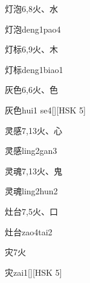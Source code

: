\begin{entry}{灯泡}{6,8}{⽕、⽔}
  \begin{phonetics}{灯泡}{deng1pao4}
  \end{phonetics}
\end{entry}

\begin{entry}{灯标}{6,9}{⽕、⽊}
  \begin{phonetics}{灯标}{deng1biao1}
  \end{phonetics}
\end{entry}

\begin{entry}{灰色}{6,6}{⽕、⾊}
  \begin{phonetics}{灰色}{hui1 se4}[][HSK 5]
  \end{phonetics}
\end{entry}

\begin{entry}{灵感}{7,13}{⽕、⼼}
  \begin{phonetics}{灵感}{ling2gan3}
  \end{phonetics}
\end{entry}

\begin{entry}{灵魂}{7,13}{⽕、⿁}
  \begin{phonetics}{灵魂}{ling2hun2}
  \end{phonetics}
\end{entry}

\begin{entry}{灶台}{7,5}{⽕、⼝}
  \begin{phonetics}{灶台}{zao4tai2}
  \end{phonetics}
\end{entry}

\begin{entry}{灾}{7}{⽕}
  \begin{phonetics}{灾}{zai1}[][HSK 5]
  \end{phonetics}
\end{entry}

